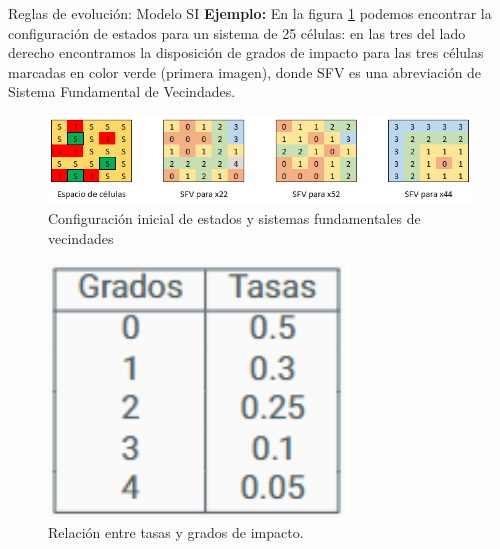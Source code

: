 \documentclass[9pt]{beamer}
\begin{document}
\begin{frame}{Reglas de evolución: Modelo SI}
\textbf{Ejemplo:}
En la figura \ref{fig:configuraciónInicialEspacio25Celulas} podemos encontrar la configuración de estados para un sistema de 25 células: en las tres del lado derecho encontramos la disposición de grados de impacto para las tres células marcadas en color verde (primera imagen), donde SFV es una abreviación de Sistema Fundamental de Vecindades.\\

\begin{minipage}{0.73\textwidth}
\begin{figure}[h]
  \centering
    \includegraphics[width=1\textwidth]{Imagenes/cellSpace.PNG}
    \caption{Configuración inicial de estados y sistemas fundamentales de vecindades}
    \label{fig:configuraciónInicialEspacio25Celulas}
\end{figure}
\end{minipage}
\hfill
\begin{minipage}{0.23\textwidth}
\begin{figure}[h]
  \centering
    \includegraphics[width=0.7\textwidth]{Imagenes/RelacionTasasYGrados_Ex_SI.png}
    \caption{Relación entre tasas y grados de impacto.}
\end{figure}
\end{minipage}


\end{frame}
\end{document}
